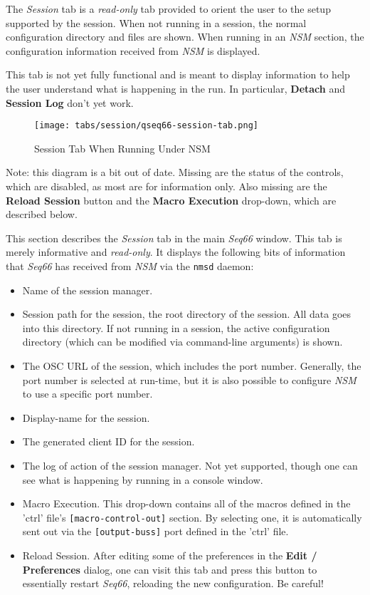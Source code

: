    The \textsl{Session} tab is a \textsl{read-only} tab
   provided to orient the user to the setup supported by the session.
   When not running in a session, the normal configuration directory and files
   are shown.  When running in an \textsl{NSM} section, the configuration
   information received from \textsl{NSM} is displayed.

   This tab is not yet fully functional and is meant to display information to
   help the user understand what is happening in the run.  In particular,
   \textbf{Detach} and \textbf{Session Log} don't yet work.

\begin{figure}[H]
   \centering 
   \texttt{[image: tabs/session/qseq66-session-tab.png]}
   \caption*{Session Tab When Running Under NSM}
\end{figure}

   Note: this diagram is a bit out of date.  Missing are the status of the
   controls, which are disabled, as most are for information only.
   Also missing are the \textbf{Reload Session} button and the
   \textbf{Macro Execution} drop-down, which are described below.

   This section describes the \textsl{Session} tab in the main
   \textsl{Seq66} window.  This tab is merely informative and
   \textsl{read-only}.
   It displays the following bits of information that \textsl{Seq66} has received
   from \textsl{NSM} via the \texttt{nmsd} daemon:

   \begin{itemize}
      \item Name of the session manager.
      \item Session path for the session, the root directory of the session.
         All data goes into this directory. If not running in a session,
         the active configuration directory (which can be modified via
         command-line arguments) is shown.
      \item The OSC URL of the session, which includes the port number.
         Generally, the port number is selected at run-time, but it is also
         possible to configure \textsl{NSM} to use a specific port number.
      \item Display-name for the session.
      \item The generated client ID for the session.
      \item The log of action of the session manager. Not yet supported,
         though one can see what is happening by running in a console window.
      \item Macro Execution.
         This drop-down contains all of the macros defined in the 'ctrl' file's
         \texttt{[macro-control-out]} section.
         By selecting one, it is automatically sent out via the
         \texttt{[output-buss]} port defined in the 'ctrl' file.
      \item Reload Session.
         After editing some of the preferences in the \textbf{Edit / Preferences}
         dialog, one can visit this tab and press this button to essentially
         restart \textsl{Seq66}, reloading the new configuration.
         Be careful!
   \end{itemize}

